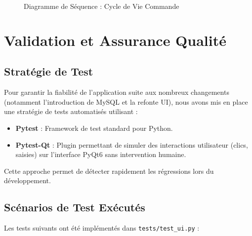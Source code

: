 \documentclass[12pt,a4paper]{report}
\begin{document}
\begin{figure}[H]
\caption{Diagramme de Séquence : Cycle de Vie Commande}
\end{figure}


\chapter{Validation et Assurance Qualité}
\section{Stratégie de Test}
Pour garantir la fiabilité de l'application suite aux nombreux changements (notamment l'introduction de MySQL et la refonte UI), nous avons mis en place une stratégie de tests automatisés utilisant :
\begin{itemize}
    \item \textbf{Pytest} : Framework de test standard pour Python.
    \item \textbf{Pytest-Qt} : Plugin permettant de simuler des interactions utilisateur (clics, saisies) sur l'interface PyQt6 sans intervention humaine.
\end{itemize}

Cette approche permet de détecter rapidement les régressions lors du développement.

\section{Scénarios de Test Exécutés}
Les tests suivants ont été implémentés dans \texttt{tests/test\_ui.py} :
\end{document}
